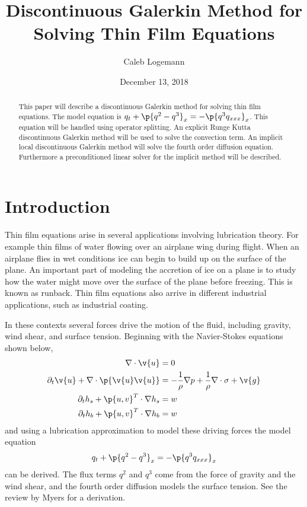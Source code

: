 \documentclass[11pt, oneside]{article}
\title{Discontinuous Galerkin Method for Solving Thin Film Equations}
\author{Caleb Logemann}
\date{December 13, 2018} %
\begin{document}
\maketitle

\begin{abstract}
  This paper will describe a discontinuous Galerkin method for solving
  thin film equations. The model equation is
  $q_t + \p{q^2 - q^3}_x = -\p{q^3 q_{xxx}}_x$.
  This equation will be handled using operator splitting.
  An explicit Runge Kutta discontinuous Galerkin method will be used to solve the
  convection term.
  An implicit local discontinuous Galerkin method will solve the fourth order
  diffusion equation.
  Furthermore a preconditioned linear solver for the implicit method will be
  described.
\end{abstract}

\section{Introduction}
  Thin film equations arise in several applications involving lubrication theory.
  For example thin films of water flowing over an airplane wing during flight.
  When an airplane flies in wet conditions ice can begin to build up on the
  surface of the plane.
  An important part of modeling the accretion of ice on a plane is to study how
  the water might move over the surface of the plane before freezing.
  This is known as runback.
  Thin film equations also arrive in different industrial applications, such as
  industrial coating.

  In these contexts several forces drive the motion of the fluid, including
  gravity, wind shear, and surface tension.
  Beginning with the Navier-Stokes equations shown below,
  \begin{align*}
    \nabla \cdot \v{u} &= 0 \\
    \partial_t \v{u} + \nabla \cdot \p{\v{u}\v{u}} &= - \frac{1}{\rho} \nabla p + \frac{1}{\rho}\nabla \cdot \sigma + \v{g} \\
    \partial_t h_s + \p{u, v}^T \cdot \nabla h_s &= w \\
    \partial_t h_b + \p{u, v}^T \cdot \nabla h_b &= w
  \end{align*}
  and using a lubrication approximation to model these driving forces the model
  equation
  \[
    q_t + \p{q^2 - q^3}_x = -\p{q^3 q_{xxx}}_x
  \]
  can be derived.
  The flux terms $q^2$ and $q^3$ come from the force of gravity and the wind
  shear, and the fourth order diffusion models the surface tension.
  See the review by Myers\cite{myersReview} for a derivation.
\end{document}
